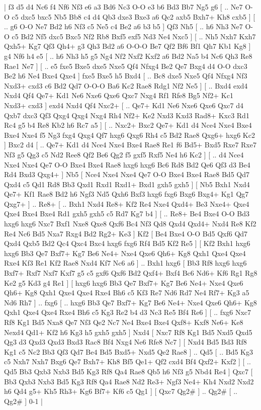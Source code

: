 \makegametitle 
|   f3   d5    d4   Nc6    f4   Nf6    Nf3   e6    a3   Bd6    Nc3   O-O    e3   b6    Bd3   Bb7    Ng5   g6 [ .. Ne7  O-O c5  dxc5 bxc5  Nb5 Bb8  c4 d4  Qb3 dxe3  Bxe3 a6  Qc2 axb5  Bxh7+ Kh8  cxb5   ]  [ .. g6  O-O Ne7  Bd2 h6  Nf3 c5  Ne5 c4  Be2 a6  b3 b5   ]  Qf3   Nh5 [ .. h6  Nh3 Ne7  O-O c5  Bd2 Nf5  dxc5 Bxc5  Nf2 Rb8  Bxf5 exf5  Nd3 Ne4  Nxc5   ]  [ .. Nh5  Nxh7 Kxh7  Qxh5+ Kg7  Qf3 Qh4+  g3 Qh3  Bd2 a6  O-O-O Be7  Qf2 Bf6  Bf1 Qh7  Kb1 Kg8   ]  g4   Nf6    h4   e5 [ .. h6  Nh3 h5  g5 Ng4  Nf2 Nxf2  Kxf2 a6  Bd2 Na5  b4 Nc6  Qh3 Re8  Rae1 Ne7   ]  [ .. e5  fxe5 Bxe5  dxe5 Nxe5  Qf4 Nfxg4  Be2 Qe7  Bxg4 d4  O-O dxc3  Be2 h6  Ne4 Bxe4  Qxe4   ]  fxe5   Bxe5    h5   Bxd4 [ .. Bc8  dxe5 Nxe5  Qf4 Nfxg4  Nf3 Nxd3+  cxd3 c6  Bd2 Qd7  O-O-O Ba6  Kc2 Rae8  Rdg1 Nf2  Ne5   ]  [ .. Bxd4  exd4 Nxd4  Qf4 Qe7+  Kd1 Ne6  Nxe6 Qxe6  Qxc7 Nxg4  Rf1 Rfe8  Bg5 Nf2+  Kc1 Nxd3+  cxd3   ]  exd4   Nxd4    Qf4   Nxc2+ [ .. Qe7+  Kd1 Ne6  Nxe6 Qxe6  Qxc7 d4  Qxb7 dxc3  Qf3 Qxg4  Qxg4 Nxg4  Rh4 Nf2+  Ke2 Nxd3  Kxd3 Rad8+  Kxc3 Rd1  Rc4 g5  b4 Re8  Kb2 h6  Rc7 a5   ]  [ .. Nxc2+  Bxc2 Qe7+  Kd1 d4  Nce4 Nxe4  Bxe4 Bxe4  Nxe4 f5  Ng3 fxg4  Qxg4 Qf7  hxg6 Qxg6  Rh4 c5  Bd2 Rae8  Qxg6+ hxg6  Kc2   ]  Bxc2   d4 [ .. Qe7+  Kd1 d4  Nce4 Nxe4  Bxe4 Rae8  Re1 f6  Bd5+ Bxd5  Rxe7 Rxe7  Nf3 g5  Qg3 c5  Nd2 Ree8  Qf2 Be6  Qg2 f5  gxf5 Rxf5  Ne4 h6  Kc2   ]  [ .. d4  Nce4 Nxe4  Nxe4 Qe7  O-O Bxe4  Bxe4 Rae8  hxg6 hxg6  Bc6 Rd8  Bd2 Qe6  Qf3 d3  Be4 Rd4  Bxd3 Qxg4+   ]  Nb5 [  Nce4 Nxe4  Nxe4 Qe7  O-O Bxe4  Bxe4 Rae8  Bd5 Qd7  Qxd4 c5  Qd1 Rd8  Bb3 Qxd1  Rxd1 Rxd1+  Bxd1 gxh5  gxh5   ]  [  Nb5 Bxh1  Nxd4 Qe7+  Kf1 Rae8  Bd2 h6  Ngf3 Nd5  Qxh6 Bxf3  hxg6 fxg6  Bxg6 Bxg4+  Kg1 Qg7  Qxg7+   ] .. Re8+ [ .. Bxh1  Nxd4 Re8+  Kf2 Re4  Nxe4 Qxd4+  Be3 Nxe4+  Qxe4 Qxe4  Bxe4 Bxe4  Rd1 gxh5  gxh5 c5  Rd7 Kg7  b4   ]  [ .. Re8+  Be4 Bxe4  O-O Bd3  hxg6 hxg6  Nxc7 Bxf1  Nxe8 Qxe8  Qxf6 Bc4  Nf3 Qd8  Qxd4 Qxd4+  Nxd4 Re8  Kf2 Re4  Nc6 Bd5  Nxa7 Rxg4  Bd2 Rg2+  Ke3   ]  Kf2 [  Be4 Bxe4  O-O Bd5  Qxf6 Qd7  Qxd4 Qxb5  Bd2 Qc4  Qxc4 Bxc4  hxg6 fxg6  Rf4 Bd5  Kf2 Re5   ]  [  Kf2 Bxh1  hxg6 hxg6  Bb3 Qe7  Bxf7+ Kg7  Be6 Ne4+  Nxe4 Qxe6  Qh6+ Kg8  Qxh1 Qxe4  Qxe4 Rxe4  Kf3 Re1  Kf2 Rae8  Nxd4 Kf7  Nc6 a6   ] .. Bxh1    hxg6 [  Bb3 Rf8  hxg6 hxg6  Bxf7+ Rxf7  Nxf7 Kxf7  g5 c5  gxf6 Qxf6  Bd2 Qxf4+  Bxf4 Bc6  Nd6+ Kf6  Rg1 Rg8  Ke2 g5  Kd3 g4  Re1   ]  [  hxg6 hxg6  Bb3 Qe7  Bxf7+ Kg7  Be6 Ne4+  Nxe4 Qxe6  Qh6+ Kg8  Qxh1 Qxe4  Qxe4 Rxe4  Bh6 c5  Kf3 Re7  Nd6 Rd7  Ne4 Rf7+  Kg3 a5  Nd6 Rh7   ] .. fxg6 [ .. hxg6  Bb3 Qe7  Bxf7+ Kg7  Be6 Ne4+  Nxe4 Qxe6  Qh6+ Kg8  Qxh1 Qxe4  Qxe4 Rxe4  Bh6 c5  Kg3 Re2  b4 d3  Nc3 Re5  Bf4 Re6   ]  [ .. fxg6  Nxc7 Rf8  Kg1 Bd5  Nxa8 Qe7  Nf3 Qe2  Nc7 Ne4  Bxe4 Bxe4  Qxf8+ Kxf8  Ne6+ Ke8  Nexd4 Qd1+  Kf2 h6  Kg3 h5  gxh5 gxh5   ]  Nxd4 [  Nxc7 Rf8  Kg1 Bd5  Nxd5 Qxd5  Qg3 d3  Qxd3 Qxd3  Bxd3 Rac8  Bf4 Nxg4  Ne6 Rfe8  Nc7   ]  [  Nxd4 Bd5  Bd3 Rf8  Kg1 c5  Nc2 Bb3  Qf3 Qd7  Be4 Bd5  Bxd5+ Nxd5  Qe2 Rae8   ] .. Qd5 [ .. Bd5  Kg3 c5  Nxh7 Nxh7  Bxg6 Qe7  Bxh7+ Kh8  Bf5 Qe1+  Qf2 cxd4  Bf4 Qxf2+  Kxf2   ]  [ .. Qd5  Bb3 Qxb3  Nxb3 Bd5  Kg3 Rf8  Qa4 Rae8  Qb5 h6  Nf3 g5  Nbd4 Re4   ]  Qxc7 [  Bb3 Qxb3  Nxb3 Bd5  Kg3 Rf8  Qa4 Rae8  Nd2 Re3+  Ngf3 Ne4+  Kh4 Nxd2  Nxd2 h6  Qd4 g5+  Kh5 Rh3+  Kg6 Bf7+  Kf6 c5  Qg1   ]  [  Qxc7 Qg2#   ] .. Qg2#    [ .. Qg2#   ] 0-1  |
